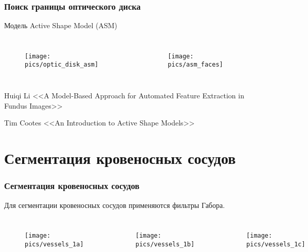 \documentclass{beamer}
\begin{document}
\begin{frame}
	\frametitle{Поиск границы оптического диска}
	
	Модель Active Shape Model (ASM)
	
	\begin{columns}[c]
			\begin{figure}
				\centering
				\texttt{[image: pics/optic\_disk\_asm]}
				\label{fig:optic_disk_asm}
			\end{figure}
			\begin{figure}
			\centering
			\texttt{[image: pics/asm\_faces]}
			\label{fig:asm_faces}
			\end{figure}
	\end{columns}
	\vspace{0.3cm}
	{\scriptsize
	{\color{gray} Huiqi Li <<A Model-Based Approach for Automated Feature Extraction in Fundus Images>>}
	
	{\color{gray} Tim Cootes <<An Introduction to Active Shape Models>>}}
\end{frame}


\section{Сегментация кровеносных сосудов}

\begin{frame}
	\frametitle{Сегментация кровеносных сосудов}
	
	Для сегментации кровеносных сосудов применяются фильтры Габора.
	\begin{columns}[c]
			\begin{figure}
				\centering
				\texttt{[image: pics/vessels\_1a]}
				\label{fig:vessels_1a}
			\end{figure}
			\begin{figure}
				\centering
				\texttt{[image: pics/vessels\_1b]}
				\label{fig:vessels_1b}
			\end{figure}
			\begin{figure}
				\centering
				\texttt{[image: pics/vessels\_1c]}
				\label{fig:vessels_1c}
			\end{figure}
	\end{columns}
\end{frame}
\end{document}
